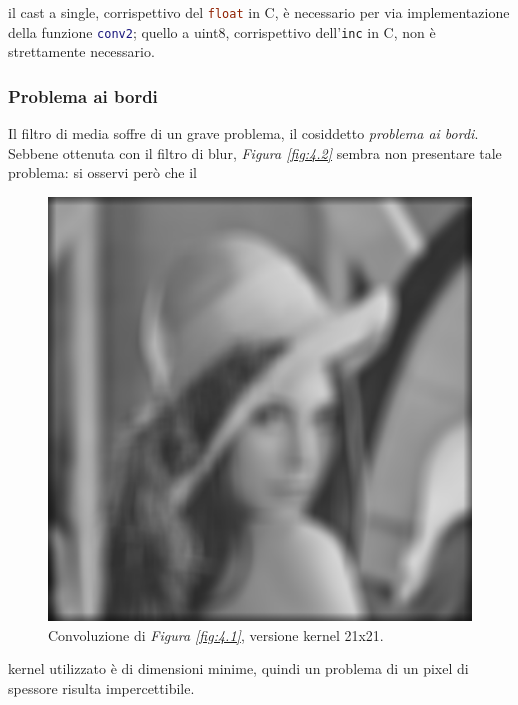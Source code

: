 \documentclass{subfiles}
\begin{document}
\begin{Note*}
    il cast a single, corrispettivo del \lstinline[language = C]{float} in C, è necessario per via implementazione della funzione \lstinline[language = MATLAB]{conv2};
    quello a uint8, corrispettivo dell'\lstinline[language = C]{inc} in C, non è strettamente necessario.
\end{Note*}
\clearpage

\subsubsection{Problema ai bordi}
Il filtro di media soffre di un grave problema, il cosiddetto \emph{problema ai bordi}.
Sebbene ottenuta con il filtro di blur, \emph{Figura \ref{fig:4.2}} sembra non presentare tale problema:
si osservi però che il
\begin{figure}
    \centering
    \includegraphics[scale = 0.325]{../Images/Lena/MeanConvolutionLena_21x21.png}
    \caption{Convoluzione di \emph{Figura \ref{fig:4.1}}, versione kernel 21x21.}
    \label{fig:4.3}
\end{figure}
kernel utilizzato è di dimensioni minime, quindi un problema di un pixel di spessore risulta impercettibile.
\end{document}
